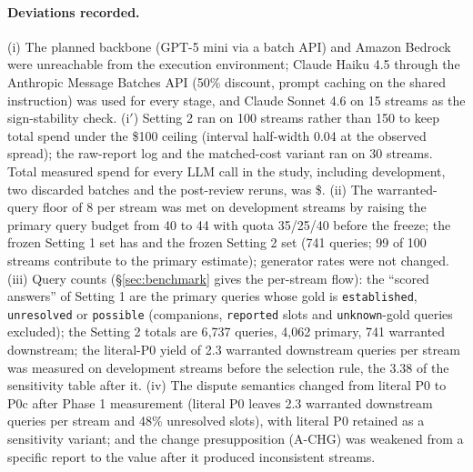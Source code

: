 \paragraph{Deviations recorded.} (i) The planned backbone (GPT-5 mini via a batch API) and Amazon Bedrock were unreachable from the execution environment; Claude Haiku 4.5 through the Anthropic Message Batches API (50\% discount, prompt caching on the shared instruction) was used for every stage, and Claude Sonnet 4.6 on 15 streams as the sign-stability check. (i$'$) Setting 2 ran on 100 streams rather than 150 to keep total spend under the \$100 ceiling (interval half-width 0.04 at the observed spread); the raw-report log and the matched-cost variant ran on 30 streams. Total measured spend for every LLM call in the study, including development, two discarded batches and the post-review reruns, was \$\spendTotal. (ii) The warranted-query floor of 8 per stream was met on development streams by raising the primary query budget from 40 to 44 with quota 35/25/40 before the freeze; the frozen Setting 1 set has \sOneWarrPerStream{} and the frozen Setting 2 set \sTwoWarrPerStream{} (741 queries; 99 of 100 streams contribute to the primary estimate); generator rates were not changed. (iii) Query counts (\S\ref{sec:benchmark} gives the per-stream flow): the \sOneAnswers{} ``scored answers'' of Setting 1 are the primary queries whose gold is \texttt{established}, \texttt{unresolved} or \texttt{possible} (companions, \texttt{reported} slots and \texttt{unknown}-gold queries excluded); the Setting 2 totals are 6{,}737 queries, 4{,}062 primary, 741 warranted downstream; the literal-P0 yield of 2.3 warranted downstream queries per stream was measured on development streams before the selection rule, the 3.38 of the sensitivity table after it. (iv) The dispute semantics changed from literal P0 to P0c after Phase 1 measurement (literal P0 leaves 2.3 warranted downstream queries per stream and 48\% unresolved slots), with literal P0 retained as a sensitivity variant; and the change presupposition (A-CHG) was weakened from a specific report to the value after it produced inconsistent streams.
